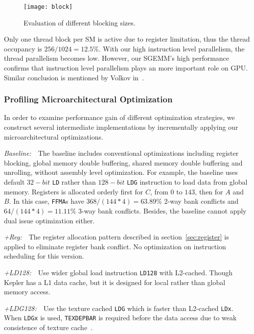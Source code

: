 \begin{figure}[htbp]
\begin{center}
\texttt{[image: block]}
    \caption{Evaluation of different blocking sizes.} %
\label{fig:block}
\end{center}
\end{figure}

Only one thread block per SM is active due to register limitation, thus the thread occupancy is $256/1024=12.5\%$.
With our high instruction level parallelism, the thread parallelism becomes low.
However, our SGEMM's high performance confirms that instruction level parallelism plays an more important role on GPU.
Similar conclusion is mentioned by Volkov in~\cite{volkov2010better}.

\subsubsection{Profiling Microarchitectural Optimization}

In order to examine performance gain of different optimization strategies, we construct several intermediate 
implementations by incrementally applying our microarchitectural optimizations.

{\it Baseline:}~~The baseline includes conventional optimizations including register blocking, global
memory double buffering, shared memory double buffering and unrolling, without assembly level optimization.
For example, the baseline uses default $32-bit$ {\tt LD} rather than $128-bit$ {\tt LDG} instruction to load data from global memory.
Registers is allocated orderly first for $C$, from $0$ to $143$, then for $A$ and $B$. 
In this case, {\tt FFMA}s have $368/(144*4)=63.89\%$ 2-way bank conflicts and $64/(144*4)=11.11\%$ 3-way bank conflicts. 
Besides, the baseline cannot apply dual issue optimization either.

{\it +Reg:}~~The register allocation pattern described in section~\ref{sec:register} is applied to eliminate register bank conflict. 
No optimization on instruction scheduling for this version.

{\it +LD128:}~~Use wider global load instruction {\tt LD128} with L2-cached.
Though Kepler has a L1 data cache, but it is designed for local rather than global memory access. ~\cite{xx}

{\it +LDG128:}~~Use the texture cached {\tt LDG} which is faster than L2-cached {\tt LDx}. 
When {\tt LDGx} is used, {\tt TEXDEPBAR} is required before the data access due to weak consistence of texture cache~\cite{lukyanov2014efficient}.

